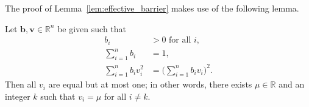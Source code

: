 The proof of Lemma~\ref{lem:effective_barrier} makes use of the following 
lemma.
\begin{lemma}\label{Davids_lemma}
	Let $\bm{b},\bm{v} \in \mathbb{R}^{n}$ be given such that
    \begin{subequations}\label{eq:DavidsLemma}
    		\begin{align}
    			b_i & > 0 \mbox{ for all } i, \label{eq:DavidsLemma_a} \\
    			\sum_{i=1}^n b_i & = 1, \label{eq:DavidsLemma_b} \\
    			\sum_{i=1}^n b_i v_i^2 & = \biggl(\sum_{i=1}^n b_i v_i\biggr)^{\!\! 2}. \label{eq:DavidsLemma_c}
    		\end{align}
    	\end{subequations}
    	Then all $v_i$ are equal but at most one; in other words, there exists 
    	$\mu \in \mathbb{R}$ and an integer $k$ such that $v_i = \mu$ for 
    	all $i \ne k$.
\end{lemma}

